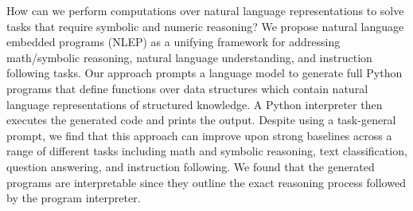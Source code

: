 How can we perform  computations over natural language representations to solve tasks that require symbolic and numeric reasoning? We propose natural language embedded programs (NLEP) as a unifying framework for  addressing math/symbolic reasoning, natural language understanding, and instruction following tasks. Our approach prompts a  language model to generate full Python programs that define functions over data structures which contain natural language representations of structured knowledge. A Python interpreter then executes the generated code and prints the output. Despite using a task-general prompt, we find that this approach can improve upon strong baselines across a range of different tasks including math and symbolic reasoning, text classification, question answering, and instruction following. We found that the generated programs are interpretable since they outline the exact reasoning process followed by the program interpreter.